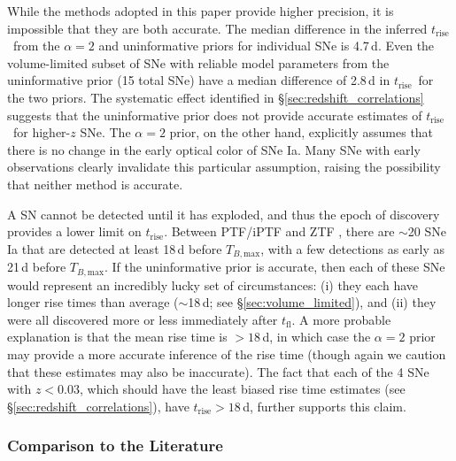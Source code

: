 \documentclass[twocolumn]{aastex63}
\newcommand{\tfl}{$t_\mathrm{fl}$}
\newcommand{\trise}{$t_\mathrm{rise}$}
\newcommand{\tbmax}{$T_{B,\mathrm{max}}$}
\begin{document}
While the methods adopted in this paper provide higher precision, it is
impossible that they are both accurate. The median difference in the inferred
\trise\ from the $\alpha = 2$ and uninformative priors for individual SNe is
4.7\,d. Even the volume-limited subset of SNe with reliable model parameters
from the uninformative prior (15 total SNe) have a median difference of 2.8\,d
in \trise\ for the two priors. The systematic effect identified in
\S\ref{sec:redshift_correlations} suggests that the uninformative prior does
not provide accurate estimates of \trise\ for higher-$z$ SNe. The
$\alpha = 2$ prior, on the other hand, explicitly assumes that there is no
change in the early optical color of SNe Ia. Many SNe with early observations
clearly invalidate this particular assumption, raising the possibility that
neither method is accurate.

A SN cannot be detected until it has exploded, and thus the epoch of discovery
provides a lower limit on \trise. Between PTF/iPTF \citep{Papadogiannakis19}
and ZTF \citep{Yao19}, there are $\sim$20 SNe Ia that are detected at least
18\,d before \tbmax, with a few detections as early as 21\,d before \tbmax. If
the uninformative prior is accurate, then each of these SNe would represent an
incredibly lucky set of circumstances: (i) they each have longer rise times
than average ($\sim$18\,d; see \S\ref{sec:volume_limited}), and (ii) they were
all discovered more or less immediately after \tfl. A more probable
explanation is that the mean rise time is $> 18$\,d, in which case the $\alpha
= 2$ prior may provide a more accurate inference of the rise time (though
again we caution that these estimates may also be inaccurate). The fact that
each of the 4 SNe with $z < 0.03$, which should have the least biased rise
time estimates (see \S\ref{sec:redshift_correlations}), have \trise$ > 18$\,d,
further supports this claim.

\subsubsection{Comparison to the Literature}
\end{document}
